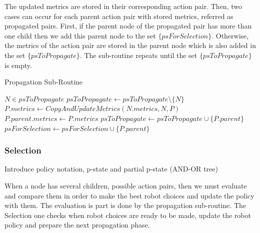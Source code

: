 The updated metrics are stored in their corresponding action pair. Then, two cases can occur for each parent action pair with stored metrics, referred as propagated pairs. First, if the parent node of the propagated pair has more than one child then we add this parent node to the set $\{psForSelection\}$. Otherwise, the metrics of the action pair are stored in the parent node which is also added in the set $\{psToPropagate\}$. 
The sub-routine repeats until the set $\{psToPropagate\}$ is empty.

\begin{algorithm}
\caption{Propagation Sub-Routine}\label{alg:propagation}
\begin{algorithmic}[1]

    \State $N \in psToPropagate$
    \State $psToPropagate \gets psToPropagate \setminus \{N\}$
        \State $P.metrics \gets CopyAndUpdateMetrics(N.metrics, N, P)$
            \State $P.parent.metrics \gets P.metrics$
            \State $psToPropagate \gets psToPropagate \cup \{P.parent\}$
        \Else
            \State $psForSelection \gets psForSelection \cup \{P.parent\}$
        \EndIf
    \EndFor
\EndWhile

\end{algorithmic}
\end{algorithm}



    \subsubsection{Selection}

Introduce policy notation, p-state and partial p-state (AND-OR tree)

When a node has several children, possible action pairs, then we must evaluate and compare them in order to make the best robot choices and update the policy with them. The evaluation is part is done by the propagation sub-routine. The Selection one checks when robot choices are ready to be made, update the robot policy and prepare the next propagation phase. 

